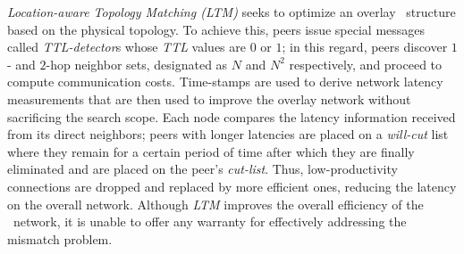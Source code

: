 \emph{Location-aware Topology Matching (LTM)} \cite{LLXNZ2004}
seeks to optimize an overlay \p\ structure based on the physical topology.
To achieve this, peers issue special messages called
\textit{TTL-detector}s whose \emph{TTL} values are $0$ or $1$;
in this regard, peers 
discover $1$- and $2$-hop neighbor sets, designated as $N$ and $N^2$
respectively, and proceed to compute communication costs.
Time-stamps are used to derive network latency measurements that are then used 
to improve the overlay network without sacrificing the search scope.
Each node compares the latency information
received from its direct neighbors;
peers with longer latencies are placed on a
\emph{will-cut} list where they remain for a certain period of time 
after which they are finally eliminated 
and are placed on the peer's \emph{cut-list}. 
Thus, low-productivity connections are dropped and replaced by 
more efficient ones, reducing the
latency on the overall network. 
Although \emph{LTM} improves the overall efficiency of
the \p\ network, it is unable to offer any warranty for 
effectively addressing the mismatch problem.
%
%
%
